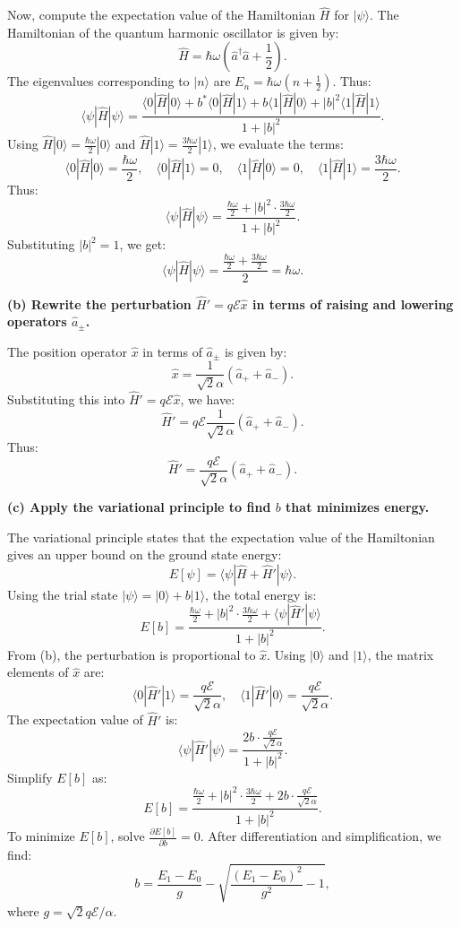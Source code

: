 Now, compute the expectation value of the Hamiltonian \(\hat{H}\) for \(|\psi\rangle\). The Hamiltonian of the quantum harmonic oscillator is given by:
\[
\hat{H} = \hbar\omega \left(\hat{a}^\dagger \hat{a} + \frac{1}{2}\right).
\]
The eigenvalues corresponding to \(|n\rangle\) are \(E_n = \hbar\omega\left(n + \frac{1}{2}\right)\). Thus:
\[
\langle \psi | \hat{H} | \psi \rangle = \frac{\langle 0 | \hat{H} | 0 \rangle + b^* \langle 0 | \hat{H} | 1 \rangle + b \langle 1 | \hat{H} | 0 \rangle + |b|^2 \langle 1 | \hat{H} | 1 \rangle}{1 + |b|^2}.
\]
Using \(\hat{H} |0\rangle = \frac{\hbar\omega}{2} |0\rangle\) and \(\hat{H} |1\rangle = \frac{3\hbar\omega}{2} |1\rangle\), we evaluate the terms:
\[
\langle 0 | \hat{H} | 0 \rangle = \frac{\hbar\omega}{2}, \quad \langle 0 | \hat{H} | 1 \rangle = 0, \quad \langle 1 | \hat{H} | 0 \rangle = 0, \quad \langle 1 | \hat{H} | 1 \rangle = \frac{3\hbar\omega}{2}.
\]
Thus:
\[
\langle \psi | \hat{H} | \psi \rangle = \frac{\frac{\hbar\omega}{2} + |b|^2 \cdot \frac{3\hbar\omega}{2}}{1 + |b|^2}.
\]
Substituting \(|b|^2 = 1\), we get:
\[
\langle \psi | \hat{H} | \psi \rangle = \frac{\frac{\hbar\omega}{2} + \frac{3\hbar\omega}{2}}{2} = \hbar\omega.
\]

\textbf{(b) Rewrite the perturbation \(\hat{H}' = q \mathcal{E} \hat{x}\) in terms of raising and lowering operators \(\hat{a}_\pm\).}

The position operator \(\hat{x}\) in terms of \(\hat{a}_\pm\) is given by:
\[
\hat{x} = \frac{1}{\sqrt{2} \alpha} (\hat{a}_+ + \hat{a}_-).
\]
Substituting this into \(\hat{H}' = q \mathcal{E} \hat{x}\), we have:
\[
\hat{H}' = q \mathcal{E} \frac{1}{\sqrt{2} \alpha} (\hat{a}_+ + \hat{a}_-).
\]
Thus:
\[
\hat{H}' = \frac{q \mathcal{E}}{\sqrt{2} \alpha} (\hat{a}_+ + \hat{a}_-).
\]

\textbf{(c) Apply the variational principle to find \(b\) that minimizes energy.}

The variational principle states that the expectation value of the Hamiltonian gives an upper bound on the ground state energy:
\[
E[\psi] = \langle \psi | \hat{H} + \hat{H}' | \psi \rangle.
\]
Using the trial state \(|\psi\rangle = |0\rangle + b |1\rangle\), the total energy is:
\[
E[b] = \frac{\frac{\hbar\omega}{2} + |b|^2 \cdot \frac{3\hbar\omega}{2} + \langle \psi | \hat{H}' | \psi \rangle}{1 + |b|^2}.
\]
From (b), the perturbation is proportional to \(\hat{x}\). Using \(|0\rangle\) and \(|1\rangle\), the matrix elements of \(\hat{x}\) are:
\[
\langle 0 | \hat{H}' | 1 \rangle = \frac{q \mathcal{E}}{\sqrt{2} \alpha}, \quad \langle 1 | \hat{H}' | 0 \rangle = \frac{q \mathcal{E}}{\sqrt{2} \alpha}.
\]
The expectation value of \(\hat{H}'\) is:
\[
\langle \psi | \hat{H}' | \psi \rangle = \frac{2 b \cdot \frac{q \mathcal{E}}{\sqrt{2} \alpha}}{1 + |b|^2}.
\]
Simplify \(E[b]\) as:
\[
E[b] = \frac{\frac{\hbar\omega}{2} + |b|^2 \cdot \frac{3\hbar\omega}{2} + 2b \cdot \frac{q \mathcal{E}}{\sqrt{2} \alpha}}{1 + |b|^2}.
\]
To minimize \(E[b]\), solve \(\frac{\partial E[b]}{\partial b} = 0\). After differentiation and simplification, we find:
\[
b = \frac{E_1 - E_0}{g} - \sqrt{\frac{(E_1 - E_0)^2}{g^2} - 1},
\]
where \(g = \sqrt{2} q \mathcal{E} / \alpha\).

